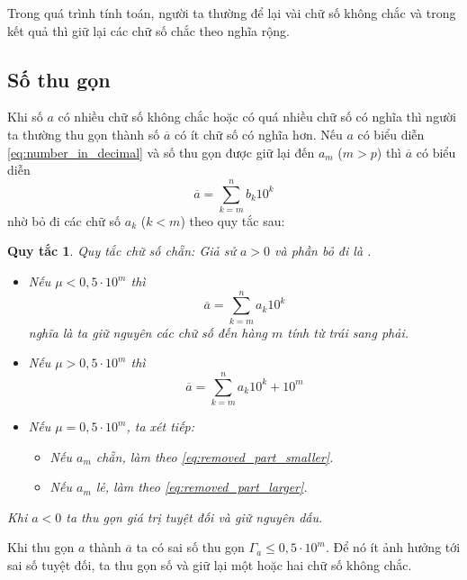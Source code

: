\documentclass{book}    %
\newtheorem*{rule_of_thumb}{Quy tắc}
\begin{document}
Trong quá trình tính toán, người ta thường để lại vài chữ số không chắc và trong
kết quả thì giữ lại các chữ số chắc theo nghĩa rộng.

\subsection{Số thu gọn}

Khi số \(a\) có nhiều chữ số không chắc hoặc có quá nhiều chữ số có nghĩa thì
người ta thường thu gọn thành số \(\overline{a}\) có ít chữ số có nghĩa hơn. Nếu
\(a\) có biểu diễn \ref{eq:number_in_decimal} và số thu gọn được giữ lại đến
\(a_m\) (\(m > p\)) thì \(\overline{a}\) có biểu diễn
\begin{equation}
    \overline{a} = \sum_{k=m}^{n} b_k 10^k
\end{equation}
nhờ bỏ đi các chữ số \(a_k\) (\(k < m\)) theo quy tắc sau:

\begin{rule_of_thumb}
Quy tắc chữ số chẵn: Giả sử \(a > 0\) và phần bỏ đi là \mu.

\begin{itemize}
    \item Nếu \(\mu < 0,5 \cdot 10^m\) thì
        \begin{equation} \label{eq:removed_part_smaller}
            \overline{a} = \sum_{k=m}^{n} a_k 10^k
        \end{equation}
        nghĩa là ta giữ nguyên các chữ số đến hàng \(m\) tính từ trái sang phải.
    \item Nếu \(\mu > 0,5 \cdot 10^m\) thì
        \begin{equation} \label{eq:removed_part_larger}
            \overline{a} = \sum_{k=m}^{n} a_k 10^k + 10^m
        \end{equation}
    \item Nếu \(\mu = 0,5 \cdot 10^m\), ta xét tiếp:
        \begin{itemize}
            \item Nếu \(a_m\) chẵn, làm theo \ref{eq:removed_part_smaller}.
            \item Nếu \(a_m\) lẻ, làm theo \ref{eq:removed_part_larger}.
        \end{itemize}
\end{itemize}

Khi \(a < 0\) ta thu gọn giá trị tuyệt đối và giữ nguyên dấu.
\end{rule_of_thumb}

Khi thu gọn \(a\) thành \(\overline{a}\) ta có sai số thu gọn \(\Gamma_a \leq
0,5 \cdot 10^m\). Để nó ít ảnh hưởng tới sai số tuyệt đối, ta thu gọn số và giữ
lại một hoặc hai chữ số không chắc.
\end{document}
